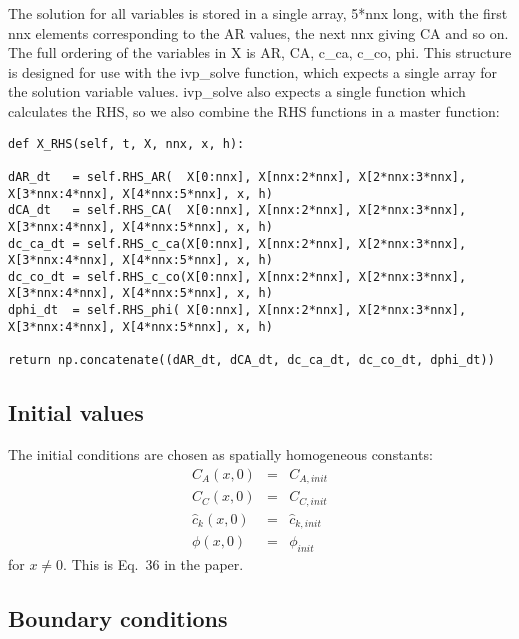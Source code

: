 \documentclass[a4paper]{article}
\begin{document}
The solution for all variables is stored in a single array, 5*nnx long, with the first nnx elements corresponding to the AR values, the next nnx giving CA and so on.  The full ordering of the variables in X is AR, CA, c\_ca, c\_co, phi.  This structure is designed for use with the ivp\_solve function, which expects a single array for the solution variable values.  ivp\_solve also expects a single function which calculates the RHS, so we also combine the RHS functions in a master function:
\begin{lstlisting}
def X_RHS(self, t, X, nnx, x, h):
        
dAR_dt   = self.RHS_AR(  X[0:nnx], X[nnx:2*nnx], X[2*nnx:3*nnx], X[3*nnx:4*nnx], X[4*nnx:5*nnx], x, h)
dCA_dt   = self.RHS_CA(  X[0:nnx], X[nnx:2*nnx], X[2*nnx:3*nnx], X[3*nnx:4*nnx], X[4*nnx:5*nnx], x, h)
dc_ca_dt = self.RHS_c_ca(X[0:nnx], X[nnx:2*nnx], X[2*nnx:3*nnx], X[3*nnx:4*nnx], X[4*nnx:5*nnx], x, h)
dc_co_dt = self.RHS_c_co(X[0:nnx], X[nnx:2*nnx], X[2*nnx:3*nnx], X[3*nnx:4*nnx], X[4*nnx:5*nnx], x, h)
dphi_dt  = self.RHS_phi( X[0:nnx], X[nnx:2*nnx], X[2*nnx:3*nnx], X[3*nnx:4*nnx], X[4*nnx:5*nnx], x, h)
        
return np.concatenate((dAR_dt, dCA_dt, dc_ca_dt, dc_co_dt, dphi_dt)) 
\end{lstlisting}


\subsection*{Initial values}

The initial conditions are chosen as spatially homogeneous constants:
\begin{eqnarray}
C_A(x,0)&=&C_{A,init} \\
C_C(x,0)&=&C_{C,init} \\
\hat{c}_k(x,0)&=&\hat{c}_{k,init} \\
\phi(x,0) &=& \phi_{init}
\end{eqnarray}
for $x\ne 0$. This is Eq.~36 in the paper.

\subsection*{Boundary conditions}
\end{document}
